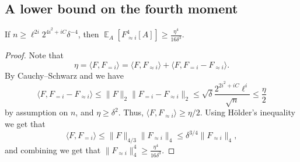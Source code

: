 \documentclass{toc}
\newcommand\Expect[2]{{\mathop{\mathbb{E}}_{#1}\left[ {#2} \right]}}
\newcommand\norm[1]{\| #1 \|}
\newcommand\inner[2]{\langle{#1},{#2}\rangle}
\renewcommand\geq{\geqslant}
\renewcommand\leq{\leqslant}
\newcommand\lvlfn[2]{{#1}_{={#2}}}
\newcommand\approxlvlfn[2]{{#1}_{\approx{#2}}}
\begin{document}
\subsection{A lower bound on the fourth moment}
\begin{claim}\label{claim:fourth_lower}
  If $n\geq \ell^{2i} 2^{4i^2 + iC} \delta^{-4}$, then $\Expect{A}{\approxlvlfn{F}{i}^4[A]}\geq \frac{\eta^4}{16\delta^3}$.
\end{claim}
\begin{proof}
  Note that
  \[
  \eta
  = \inner{F}{\lvlfn{F}{i}}
  = \inner{F}{\approxlvlfn{F}{i}}
  + \inner{F}{\lvlfn{F}{i}-\approxlvlfn{F}{i}}.
  \]
  By %
Cauchy--Schwarz   %
and  we have
  \[
  \inner{F}{\lvlfn{F}{i}-\approxlvlfn{F}{i}}
  \leq
  \norm{F}_2\norm{\lvlfn{F}{i}-\approxlvlfn{F}{i}}_2
  \leq \sqrt{\delta}\frac{2^{2i^2+iC} \ell^{i}}{\sqrt{n}}
  \leq \frac{\eta}{2}
  \]
  by assumption on $n$, and $\eta\geq \delta^2$. Thus, $\inner{F}{\approxlvlfn{F}{i}}\geq \eta/2$. Using H\"{o}lder's inequality we get that
  \[
  \inner{F}{\lvlfn{F}{i}}\leq \norm{F}_{4/3}\norm{\approxlvlfn{F}{i}}_4 \leq \delta^{3/4}\norm{\approxlvlfn{F}{i}}_4,
  \]
  and combining we get that $\norm{\approxlvlfn{F}{i}}_4^4\geq \frac{\eta^4}{16\delta^3}$.
\end{proof}
\end{document}
